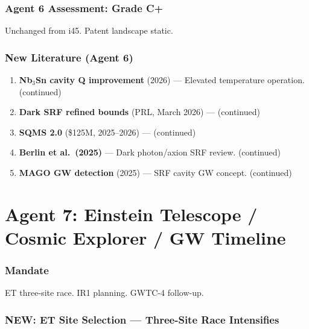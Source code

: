 \documentclass[11pt,a4paper]{article}
\newcommand{\NEW}{\textcolor{dfdblue}{\textbf{NEW}}}
\begin{document}
\section{Agent 6 Assessment: Grade C+}

Unchanged from i45. Patent landscape static.

\section{New Literature (Agent 6)}

\begin{enumerate}
\item \textbf{Nb$_3$Sn cavity Q improvement} (2026) --- Elevated temperature operation. (continued)
\item \textbf{Dark SRF refined bounds} (PRL, March 2026) --- (continued)
\item \textbf{SQMS 2.0} (\$125M, 2025--2026) --- (continued)
\item \textbf{Berlin et al.\ (2025)} --- Dark photon/axion SRF review. (continued)
\item \textbf{MAGO GW detection} (2025) --- SRF cavity GW concept. (continued)
\end{enumerate}


\part{Agent 7: Einstein Telescope / Cosmic Explorer / GW Timeline}
\label{part:agent7}

\section{Mandate}

ET three-site race. IR1 planning. GWTC-4 follow-up.

\section{\NEW: ET Site Selection --- Three-Site Race Intensifies}
\end{document}
